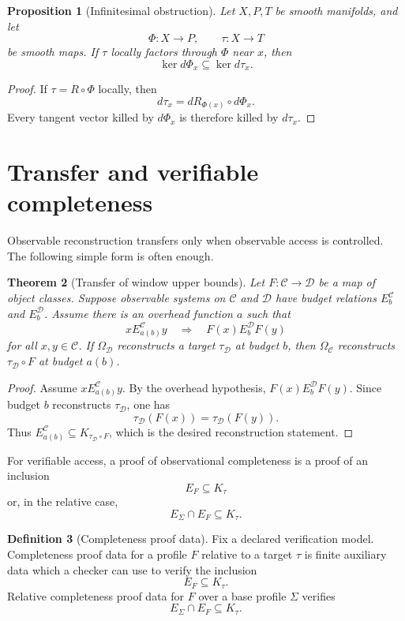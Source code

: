 \documentclass[11pt]{article}
\newtheorem{theorem}{Theorem}[section]
\newtheorem{proposition}[theorem]{Proposition}
\theoremstyle{definition}
\newtheorem{definition}[theorem]{Definition}
\theoremstyle{remark}
\begin{document}
\begin{proposition}[Infinitesimal obstruction]
Let \(X,P,T\) be smooth manifolds, and let
\[
\Phi:X\to P,\qquad \tau:X\to T
\]
be smooth maps.  If \(\tau\) locally factors through \(\Phi\) near \(x\), then
\[
\ker d\Phi_x\subseteq \ker d\tau_x.
\]
\end{proposition}

\begin{proof}
If \(\tau=R\circ\Phi\) locally, then
\[
d\tau_x=dR_{\Phi(x)}\circ d\Phi_x.
\]
Every tangent vector killed by \(d\Phi_x\) is therefore killed by \(d\tau_x\).
\end{proof}

\section{Transfer and verifiable completeness}

Observable reconstruction transfers only when observable access is controlled.  The following simple form is often enough.

\begin{theorem}[Transfer of window upper bounds]
Let \(F:\mathcal C\to\mathcal D\) be a map of object classes.  Suppose observable systems on \(\mathcal C\) and \(\mathcal D\) have budget relations \(E^{\mathcal C}_b\) and \(E^{\mathcal D}_b\).  Assume there is an overhead function \(a\) such that
\[
xE^{\mathcal C}_{a(b)}y
\quad\Longrightarrow\quad
F(x)E^{\mathcal D}_bF(y)
\]
for all \(x,y\in\mathcal C\).  If \(\Omega_{\mathcal D}\) reconstructs a target \(\tau_{\mathcal D}\) at budget \(b\), then \(\Omega_{\mathcal C}\) reconstructs \(\tau_{\mathcal D}\circ F\) at budget \(a(b)\).
\end{theorem}

\begin{proof}
Assume \(xE^{\mathcal C}_{a(b)}y\).  By the overhead hypothesis, \(F(x)E^{\mathcal D}_bF(y)\).  Since budget \(b\) reconstructs \(\tau_{\mathcal D}\), one has
\[
\tau_{\mathcal D}(F(x))=\tau_{\mathcal D}(F(y)).
\]
Thus \(E^{\mathcal C}_{a(b)}\subseteq K_{\tau_{\mathcal D}\circ F}\), which is the desired reconstruction statement.
\end{proof}

For verifiable access, a proof of observational completeness is a proof of an inclusion
\[
E_F\subseteq K_\tau
\]
or, in the relative case,
\[
E_\Sigma\cap E_F\subseteq K_\tau.
\]

\begin{definition}[Completeness proof data]
Fix a declared verification model.  Completeness proof data for a profile \(F\) relative to a target \(\tau\) is finite auxiliary data which a checker can use to verify the inclusion
\[
E_F\subseteq K_\tau.
\]
Relative completeness proof data for \(F\) over a base profile \(\Sigma\) verifies
\[
E_\Sigma\cap E_F\subseteq K_\tau.
\]
\end{definition}
\end{document}
